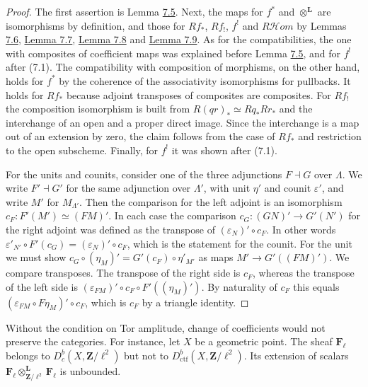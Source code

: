\documentclass[11pt]{article}
\providecommand{\Dbc}{}\renewcommand{\Dbc}{D^b_c}
\providecommand{\cHom}{}\renewcommand{\cHom}{R\mathcal{H}\!om}
\begin{document}
\begin{proof}[{Proof}]\label{bp627}%
The first assertion is Lemma \hyperref[bp614]{7.5}. Next, the maps for \(f^*\) and \(\otimes^{\mathbf L}\) are isomorphisms by definition, and those for \(Rf_*\), \(Rf_!\), \(f^!\) and \(\cHom\) by Lemmas \hyperref[bp616]{7.6}, \hyperref[bp618]{Lemma 7.7}, \hyperref[bp621]{Lemma 7.8} and \hyperref[bp623]{Lemma 7.9}. As for the compatibilities, the one with composites of coefficient maps was explained before Lemma \hyperref[bp614]{7.5}, and for \(f^!\) after (7.1). The compatibility with composition of morphisms, on the other hand, holds for \(f^*\) by the coherence of the associativity isomorphisms for pullbacks. It holds for \(Rf_*\) because adjoint transposes of composites are composites. For \(Rf_!\) the composition isomorphism is built from \(R(qr)_*\simeq Rq_*Rr_*\) and the interchange of an open and a proper direct image. Since the interchange is a map out of an extension by zero, the claim follows from the case of \(Rf_*\) and restriction to the open subscheme. Finally, for \(f^!\) it was shown after (7.1).

For the units and counits, consider one of the three adjunctions \(F\dashv G\) over \(\Lambda\). We write \(F'\dashv G'\) for the same adjunction over \(\Lambda'\), with unit \(\eta'\) and counit \(\varepsilon'\), and write \(M'\) for \(M_{\Lambda'}\). Then the comparison for the left adjoint is an isomorphism \(c_F:F'(M')\simeq(FM)'\). In each case the comparison \(c_G:(GN)'\to G'(N')\) for the right adjoint was defined as the transpose of \((\varepsilon_N)'\circ c_F\). In other words \(\varepsilon'_{N'}\circ F'(c_G)=(\varepsilon_N)'\circ c_F\), which is the statement for the counit. For the unit we must show \(c_G\circ(\eta_M)'=G'(c_F)\circ\eta'_{M'}\) as maps \(M'\to G'((FM)')\). We compare transposes. The transpose of the right side is \(c_F\), whereas the transpose of the left side is \((\varepsilon_{FM})'\circ c_F\circ F'((\eta_M)')\). By naturality of \(c_F\) this equals \((\varepsilon_{FM}\circ F\eta_M)'\circ c_F\), which is \(c_F\) by a triangle identity.
\end{proof}

\label{bp628}%
Without the condition on Tor amplitude, change of coefficients would not preserve the categories. For instance, let \(X\) be a geometric point. The sheaf \(\mathbf F_\ell\) belongs to \(\Dbc(X,\mathbf Z/\ell^2)\) but not to \(D^b_{\mathrm{ctf}}(X,\mathbf Z/\ell^2)\). Its extension of scalars \(\mathbf F_\ell\otimes^{\mathbf L}_{\mathbf Z/\ell^2}\mathbf F_\ell\) is unbounded.
\end{document}
